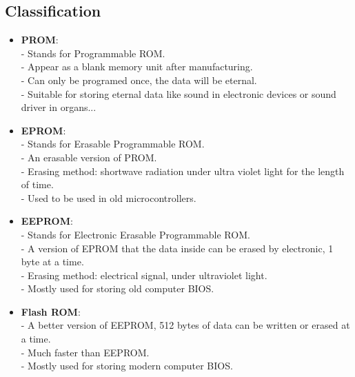\documentclass [12pt]{article}
\begin{document}
		\subsection{Classification}
			\begin {itemize}
				\item \textbf{PROM}: \\
					- Stands for Programmable ROM.\\
					- Appear as a blank memory unit after manufacturing.\\
					- Can only be programed once, the data will be eternal.\\
					- Suitable for storing eternal data like sound in electronic devices or sound driver in organs...\\
					
				\item \textbf{EPROM}:\\
				- Stands for Erasable Programmable ROM.\\
				- An erasable version of PROM.\\
				- Erasing method:  shortwave radiation under ultra violet light for the length of time.\\
				- Used to be used in old microcontrollers.\\
				
				 \item \textbf{EEPROM}:\\
				- Stands for Electronic Erasable Programmable ROM.\\
				- A version of EPROM that the data inside can be erased by electronic, 1 byte at a time.\\
				- Erasing method:  electrical signal, under ultraviolet light.\\
				- Mostly used for storing old computer BIOS.\\
				
				 \item \textbf{Flash ROM}:\\
				- A better version of EEPROM, 512 bytes of data can be written or erased at a time.\\
				- Much faster than EEPROM.\\
				- Mostly used for storing modern computer BIOS.\\
					
			\end {itemize}
			
\end{document}
